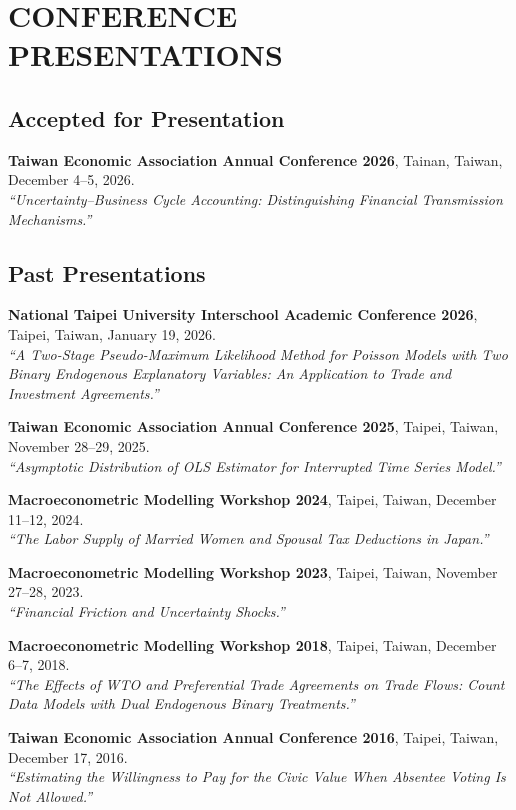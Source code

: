 \documentclass{article}
\newcommand{\cvsection}[1]{\section*{\MakeUppercase{#1}}}
\newcommand{\cvsubsection}[1]{\subsection*{\rmfamily\hspace{1.6em}#1}}
\begin{document}
\cvsection{Conference Presentations}

\cvsubsection{Accepted for Presentation}

\begin{cvlist}
    \item \textbf{Taiwan Economic Association Annual Conference 2026}, Tainan, Taiwan, December 4--5, 2026. \\
    \hspace*{1.2em}\textit{“Uncertainty--Business Cycle Accounting: Distinguishing Financial Transmission Mechanisms.”}
\end{cvlist}

\cvsubsection{Past Presentations}

\begin{cvlist}
    \item \textbf{National Taipei University Interschool Academic Conference 2026}, Taipei, Taiwan, January 19, 2026. \\
    \hspace*{1.2em}\textit{“A Two-Stage Pseudo-Maximum Likelihood Method for Poisson Models with Two Binary Endogenous Explanatory Variables: An Application to Trade and Investment Agreements.”}
    \item \textbf{Taiwan Economic Association Annual Conference 2025}, Taipei, Taiwan, November 28--29, 2025. \\
    \hspace*{1.2em}\textit{“Asymptotic Distribution of OLS Estimator for Interrupted Time Series Model.”}
    \item \textbf{Macroeconometric Modelling Workshop 2024}, Taipei, Taiwan, December 11--12, 2024. \\
    \hspace*{1.2em}\textit{“The Labor Supply of Married Women and Spousal Tax Deductions in Japan.”}
    \item \textbf{Macroeconometric Modelling Workshop 2023}, Taipei, Taiwan, November 27--28, 2023. \\
    \hspace*{1.2em}\textit{“Financial Friction and Uncertainty Shocks.”}
    \item \textbf{Macroeconometric Modelling Workshop 2018}, Taipei, Taiwan, December 6--7, 2018. \\
    \hspace*{1.2em}\textit{“The Effects of WTO and Preferential Trade Agreements on Trade Flows: Count Data Models with Dual Endogenous Binary Treatments.”}
    \item \textbf{Taiwan Economic Association Annual Conference 2016}, Taipei, Taiwan, December 17, 2016. \\
    \hspace*{1.2em}\textit{“Estimating the Willingness to Pay for the Civic Value When Absentee Voting Is Not Allowed.”}
\end{cvlist}
\end{document}

